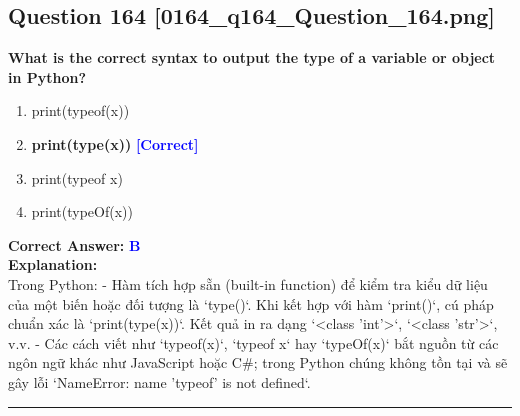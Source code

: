 \documentclass[11pt,a4paper]{article}
\begin{document}
\begin{minipage}{\textwidth}
\subsection*{Question 164 \quad \footnotesize{[0164_q164_Question_164.png]}}
\noindent \textbf{What is the correct syntax to output the type of a variable or object in Python?}

\begin{enumerate}[label=\Alph*.]
    \item print(typeof(x))
    \item \textbf{print(type(x))} \hfill \textcolor{blue}{\textbf{[Correct]}}
    \item print(typeof x)
    \item print(typeOf(x))
\end{enumerate}

\noindent \textbf{Correct Answer:} \textcolor{blue}{\textbf{B}} \\[4pt]
\noindent \textbf{Explanation:}\\
Trong Python:\newline
- Hàm tích hợp sẵn (built-in function) để kiểm tra kiểu dữ liệu của một biến hoặc đối tượng là `type()`. Khi kết hợp với hàm `print()`, cú pháp chuẩn xác là `print(type(x))`. Kết quả in ra dạng `<class 'int'>`, `<class 'str'>`, v.v.\newline
- Các cách viết như `typeof(x)`, `typeof x` hay `typeOf(x)` bắt nguồn từ các ngôn ngữ khác như JavaScript hoặc C#; trong Python chúng không tồn tại và sẽ gây lỗi `NameError: name 'typeof' is not defined`.
\end{minipage}
\vspace{0.8cm}
\hrule
\vspace{0.5cm}
\end{document}
